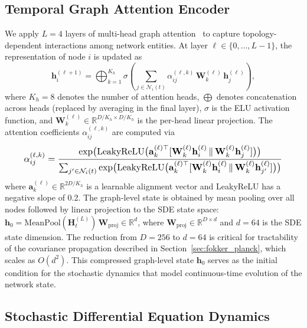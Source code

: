 \documentclass[journal]{IEEEtran}
\newcommand{\R}{\mathbb{R}}
\begin{document}
\subsection{Temporal Graph Attention Encoder}

We apply $L = 4$ layers of multi-head graph attention~\cite{velivckovic2018graph} to capture topology-dependent interactions among network entities. At layer $\ell \in \{0, \ldots, L{-}1\}$, the representation of node $i$ is updated as
\begin{equation}
\mathbf{h}_i^{(\ell+1)} = \bigoplus_{k=1}^{K_h} \sigma\!\left(\sum_{j \in \mathcal{N}_i(t)} \alpha_{ij}^{(\ell,k)} \, \mathbf{W}_k^{(\ell)} \, \mathbf{h}_j^{(\ell)}\right),
\label{eq:gat}
\end{equation}
where $K_h = 8$ denotes the number of attention heads, $\bigoplus$ denotes concatenation across heads (replaced by averaging in the final layer), $\sigma$ is the ELU activation function, and $\mathbf{W}_k^{(\ell)} \in \R^{D/K_h \times D/K_h}$ is the per-head linear projection. The attention coefficients $\alpha_{ij}^{(\ell,k)}$ are computed via
\begin{equation}
\resizebox{0.91\columnwidth}{!}{$\displaystyle
\alpha_{ij}^{(\ell,k)} = \frac{\exp\!\big(\mathrm{LeakyReLU}\big(\mathbf{a}_k^{(\ell)\top}[\mathbf{W}_k^{(\ell)}\mathbf{h}_i^{(\ell)} \,\|\, \mathbf{W}_k^{(\ell)}\mathbf{h}_j^{(\ell)}]\big)\big)}{\sum_{j' \in \mathcal{N}_i(t)} \exp\!\big(\mathrm{LeakyReLU}\big(\mathbf{a}_k^{(\ell)\top}[\mathbf{W}_k^{(\ell)}\mathbf{h}_i^{(\ell)} \,\|\, \mathbf{W}_k^{(\ell)}\mathbf{h}_{j'}^{(\ell)}]\big)\big)}$}
\label{eq:attention_coeff}
\end{equation}
where $\mathbf{a}_k^{(\ell)} \in \R^{2D/K_h}$ is a learnable alignment vector and LeakyReLU has a negative slope of 0.2. The graph-level state is obtained by mean pooling over all nodes followed by linear projection to the SDE state space: $\mathbf{h}_0 = \mathrm{MeanPool}(\mathbf{H}_t^{(L)})\,\mathbf{W}_{\mathrm{proj}} \in \R^d$, where $\mathbf{W}_{\mathrm{proj}} \in \R^{D \times d}$ and $d = 64$ is the SDE state dimension. The reduction from $D = 256$ to $d = 64$ is critical for tractability of the covariance propagation described in Section~\ref{sec:fokker_planck}, which scales as $O(d^2)$. This compressed graph-level state $\mathbf{h}_0$ serves as the initial condition for the stochastic dynamics that model continuous-time evolution of the network state.


\subsection{Stochastic Differential Equation Dynamics}
\end{document}
